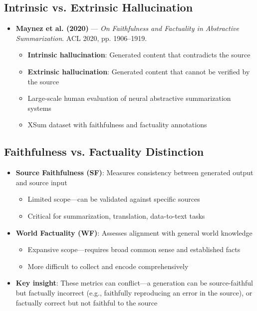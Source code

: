\documentclass[11pt,letterpaper]{article}
\begin{document}
\subsection{Intrinsic vs. Extrinsic Hallucination}

\begin{itemize}[leftmargin=*]
\item \textbf{Maynez et al. (2020)} --- \textit{On Faithfulness and Factuality in Abstractive Summarization}. ACL 2020, pp. 1906--1919.
  \begin{itemize}
  \item \textbf{Intrinsic hallucination}: Generated content that contradicts the source
  \item \textbf{Extrinsic hallucination}: Generated content that cannot be verified by the source
  \item Large-scale human evaluation of neural abstractive summarization systems
  \item XSum dataset with faithfulness and factuality annotations
  \end{itemize}
\end{itemize}

\subsection{Faithfulness vs. Factuality Distinction}

\begin{itemize}[leftmargin=*]
\item \textbf{Source Faithfulness (SF)}: Measures consistency between generated output and source input
  \begin{itemize}
  \item Limited scope---can be validated against specific sources
  \item Critical for summarization, translation, data-to-text tasks
  \end{itemize}

\item \textbf{World Factuality (WF)}: Assesses alignment with general world knowledge
  \begin{itemize}
  \item Expansive scope---requires broad common sense and established facts
  \item More difficult to collect and encode comprehensively
  \end{itemize}

\item \textbf{Key insight}: These metrics can conflict---a generation can be source-faithful but factually incorrect (e.g., faithfully reproducing an error in the source), or factually correct but not faithful to the source
\end{itemize}
\end{document}
